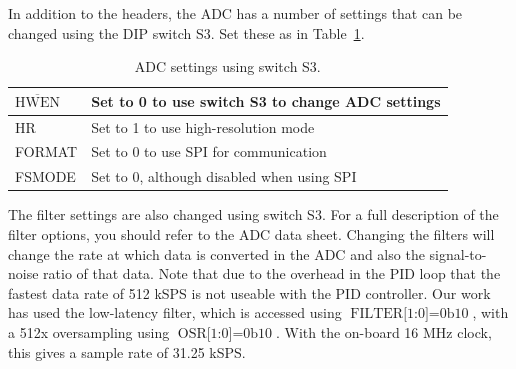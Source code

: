 \documentclass{article}
\begin{document}
In addition to the headers, the ADC has a number of settings that can be changed using the DIP switch S3.  Set these as in Table~\ref{tb:ADCsettings}.
\begin{table}[htbp]
	\centering
	\begin{tabular}{|l|l|}
		\hline
		$\overline{\text{HWEN}}$ & Set to 0 to use switch S3 to change ADC settings\\\hline
		HR & Set to 1 to use high-resolution mode\\\hline
		FORMAT & Set to 0 to use SPI for communication\\\hline
		FSMODE & Set to 0, although disabled when using SPI\\\hline
	\end{tabular}
	\caption{ADC settings using switch S3.}
	\label{tb:ADCsettings}
\end{table}
The filter settings are also changed using switch S3.  For a full description of the filter options, you should refer to the ADC data sheet.  Changing the filters will change the rate at which data is converted in the ADC and also the signal-to-noise ratio of that data.  Note that due to the overhead in the PID loop that the fastest data rate of 512 kSPS is not useable with the PID controller.  Our work has used the low-latency filter, which is accessed using $\text{FILTER[1:0]} = \text{0b10}$, with a 512x oversampling using $\text{OSR[1:0]} = \text{0b10}$.  With the on-board 16 MHz clock, this gives a sample rate of 31.25 kSPS.  
\end{document}
